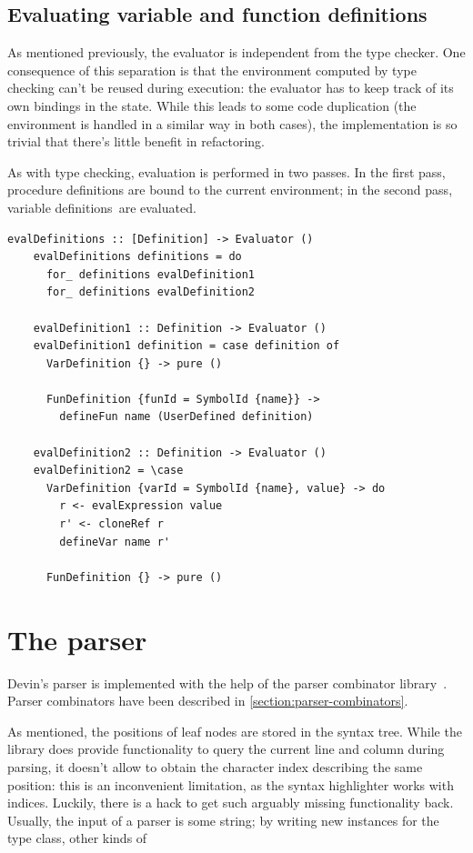 \documentclass[UdineBachThesis,american,11pt]{PhdThesis}
\begin{document}
  \newpage

  \subsection{Evaluating variable and function definitions}

  As mentioned previously, the evaluator is independent from the type checker.
  One consequence of this separation is that the environment computed by type
  checking can't be reused during execution: the evaluator has to keep track of
  its own bindings in the state. While this leads to some code duplication (the
  environment is handled in a similar way in both cases), the implementation is
  so trivial that there's little benefit in refactoring.

  As with type checking, evaluation is performed in two passes. In the first
  pass, procedure definitions are bound to the current environment; in the
  second pass, variable definitions~are evaluated.

  \begin{lstlisting}[gobble=4,basicstyle=\ttfamily\small]
    evalDefinitions :: [Definition] -> Evaluator ()
    evalDefinitions definitions = do
      for_ definitions evalDefinition1
      for_ definitions evalDefinition2

    evalDefinition1 :: Definition -> Evaluator ()
    evalDefinition1 definition = case definition of
      VarDefinition {} -> pure ()

      FunDefinition {funId = SymbolId {name}} ->
        defineFun name (UserDefined definition)

    evalDefinition2 :: Definition -> Evaluator ()
    evalDefinition2 = \case
      VarDefinition {varId = SymbolId {name}, value} -> do
        r <- evalExpression value
        r' <- cloneRef r
        defineVar name r'

      FunDefinition {} -> pure ()
  \end{lstlisting}

  \section{The parser}

  Devin's parser is implemented with the help of the \lstinline@parsec@ parser
  combinator library~\cite{parsec}. Parser combinators have been described in
  \autoref{section:parser-combinators}.

  As mentioned, the positions of leaf nodes are stored in the syntax tree. While
  the \lstinline@parsec@ library does provide functionality to query the current
  line and column during parsing, it doesn't allow to obtain the character index
  describing the same position: this is an inconvenient limitation, as the
  syntax highlighter works with indices. Luckily, there is a hack to get such
  arguably missing functionality back. Usually, the input of a
  \lstinline@parsec@ parser is some string; by writing new instances for the
  \lstinline@Stream@ type class, other kinds of \linebreak
\end{document}
